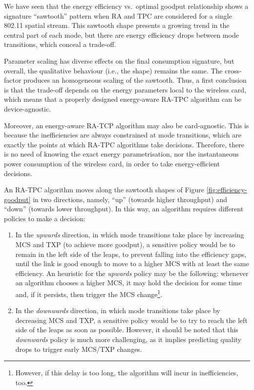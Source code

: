 \documentclass[twoside,nohyper]{tufte-book}
\providecommand{\tightlist}{%
  \setlength{\itemsep}{0pt}\setlength{\parskip}{0pt}}
\begin{document}
We have seen that the energy efficiency vs.~optimal goodput relationship shows a signature ``sawtooth'' pattern when RA and TPC are considered for a single 802.11 spatial stream. This sawtooth shape presents a growing trend in the central part of each mode, but there are energy efficiency drops between mode transitions, which conceal a trade-off.

Parameter scaling has diverse effects on the final consumption signature, but overall, the qualitative behaviour (i.e., the shape) remains the same. The cross-factor produces an homogeneous scaling of the sawtooth. Thus, a first conclusion is that the trade-off depends on the energy parameters local to the wireless card, which means that a properly designed energy-aware RA-TPC algorithm can be device-agnostic.

Moreover, an energy-aware RA-TCP algorithm may also be card-agnostic. This is because the inefficiencies are always constrained at mode transitions, which are exactly the points at which RA-TPC algorithms take decisions. Therefore, there is no need of knowing the exact energy parametrisation, nor the instantaneous power consumption of the wireless card, in order to take energy-efficient decisions.

An RA-TPC algorithm moves along the sawtooth shapes of Figure \ref{fig:efficiency-goodput} in two directions, namely, ``up'' (towards higher throughput) and ``down'' (towards lower throughput). In this way, an algorithm requires different policies to make a decision:

\begin{enumerate}
\def\labelenumi{(\roman{enumi})}
\tightlist
\item
  In the \emph{upwards} direction, in which mode transitions take place by increasing MCS and TXP (to achieve more goodput), a sensitive policy would be to remain in the left side of the leaps, to prevent falling into the efficiency gaps, until the link is good enough to move to a higher MCS with at least the same efficiency. An heuristic for the \emph{upwards} policy may be the following: whenever an algorithm chooses a higher MCS, it may hold the decision for some time and, if it persists, then trigger the MCS change\footnote{However, if this delay is too long, the algorithm will incur in inefficiencies, too.}.
\item
  In the \emph{downwards} direction, in which mode transitions take place by decreasing MCS and TXP, a sensitive policy would be to try to reach the left side of the leaps as soon as possible. However, it should be noted that this \emph{downwards} policy is much more challenging, as it implies predicting quality drops to trigger early MCS/TXP changes.
\end{enumerate}
\end{document}
